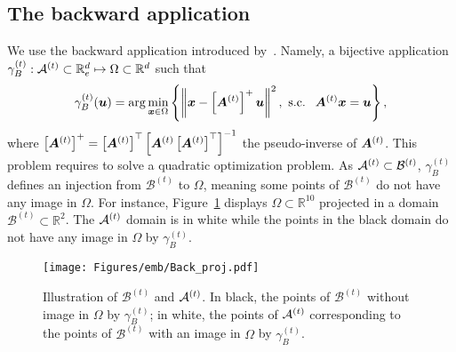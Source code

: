 \subsection{The backward application}
\label{ssec:reverse}

We use the backward application introduced by~\cite{binoisChoiceLowdimensionalDomain2020}. Namely, a bijective application $\gamma_B^{(t)} : {\mathcal{A}}^{(t)} \subset \mathbb{R}^d_e \mapsto \Omega \subset \mathbb{R}^d$ such that
\begin{equation}
    \gamma_B^{(t)}(\bm{u}) = \arg \min\limits_{\bm{x} \in \Omega} \left\{ \left\| \bm{x} - \left[\bm{A}^{(t)}\right]^{+} \bm{u} \right\|^2, \ \text{s.c. } \ \bm{A}^{(t)}\bm{x} = \bm{u}  \right\},
    \label{eq:quad_prob}
\end{equation}
where {$\left[\bm{A}^{(t)}\right]^{+} = \left[\bm{A}^{(t)}\right]^\top \left[ \bm{A}^{(t)} \left[\bm{A}^{(t)}\right]^\top \right]^{-1}$} the pseudo-inverse of $\bm{A}^{(t)}$. 
This problem requires to solve a quadratic optimization problem.
As ${\mathcal{A}}^{(t)} \subset \mathcal{B}^{(t)}$, $\gamma_B^{(t)}$ defines an injection from $\mathcal{B}^{(t)}$ to $\Omega$, meaning some points of $\mathcal{B}^{(t)}$ do not have any image in $\Omega$.
For instance, Figure~\ref{fig:backpropa} displays $\Omega \subset \mathbb{R}^{10}$ projected in a domain $\mathcal{B}^{(t)} \subset \mathbb{R}^2$.
The ${\mathcal{A}}^{(t)}$ domain is 
in white while the points in the black domain do not have any image in $\Omega$ by $\gamma_B^{(t)}$.
\begin{figure}[ht!]
    \centering
    \texttt{[image: Figures/emb/Back\_proj.pdf]}
    \caption{Illustration of $\mathcal{B}^{(t)}$ and ${\mathcal{A}}^{(t)}$. In black, the points of $\mathcal{B}^{(t)}$ without image in $\Omega$ by $\gamma_B^{(t)}$; in white, the points of ${\mathcal{A}}^{(t)}$ corresponding to the points of $\mathcal{B}^{(t)}$ with an image in $\Omega$ by $\gamma_B^{(t)}$.}
    \label{fig:backpropa}
\end{figure}

